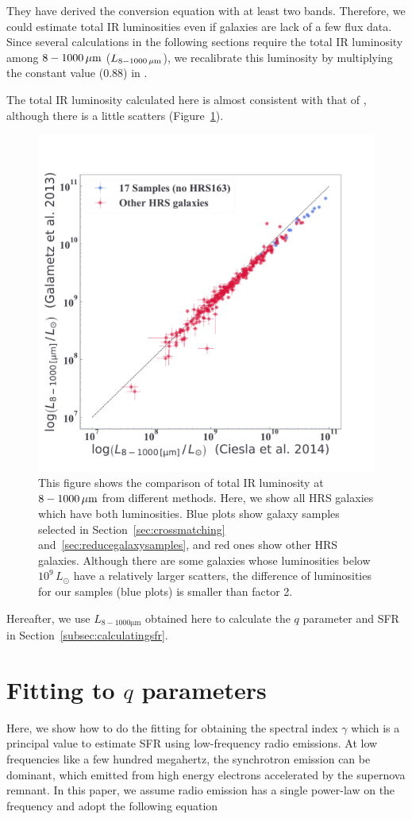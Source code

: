 They have derived the conversion equation with at least two bands.
Therefore, we could estimate total IR luminosities even if galaxies are lack of a few flux data.
Since several calculations in the following sections require the total IR luminosity among $8 - 1000\,\mathrm{\mu m}$ ($L_{\mathrm{8-1000\,\mu m}}$), we recalibrate this luminosity by multiplying the constant value (0.88) in \citet{Takeuchi2005}.

The total IR luminosity calculated here is almost consistent with that of \citet{Ciesla2014}, although there is a little scatters (Figure~\ref{fig:tircomparison}).

\begin{figure}[htbp]
	\centering
	\includegraphics[width=.6\linewidth]{Chapter_4/Figures/Method_TIRcomparison.pdf}
    \caption[The comparison of total IR luminosities]{\label{fig:tircomparison}
    This figure shows the comparison of total IR luminosity at $8-1000\,\mathrm{\mu m}$ from different methods.
            Here, we show all HRS galaxies which have both luminosities.
            Blue plots show galaxy samples selected in Section~\ref{sec:crossmatching} and~\ref{sec:reducegalaxysamples}, and red ones show other HRS galaxies.
        Although there are some galaxies whose luminosities below $10^9\,L_{\odot}$ have a relatively larger scatters, the difference of luminosities for our samples (blue plots) is smaller than factor 2.
    }
\end{figure}

Hereafter, we use $L_{8-1000\mathrm{\mu m}}$ obtained here to calculate the $q$ parameter and SFR in Section~\ref{subsec:calculatingsfr}.



\section{Fitting to $q$ parameters}\label{sec:fittingtoq}
Here, we show how to do the fitting for obtaining the spectral index $\gamma$ which is a principal value to estimate SFR using low-frequency radio emissions.
At low frequencies like a few hundred megahertz, the synchrotron emission can be dominant, which emitted from high energy electrons accelerated by the supernova remnant.
In this paper, we assume radio emission has a single power-law on the frequency and adopt the following equation

